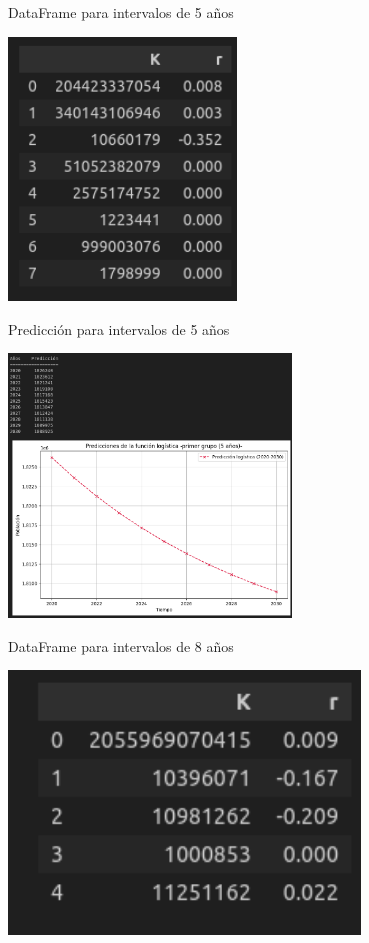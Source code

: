\documentclass{beamer}
\begin{document}
\begin{frame}{DataFrame para intervalos de 5 años}
    \begin{center}
    \includegraphics[height = 7cm]{img/df5.png}
    \end{center}
\end{frame} 


\begin{frame}{Predicción para intervalos de 5 años}
    \begin{center}
    \includegraphics[height = 7cm]{img/df5_graph.png}
    \end{center}
\end{frame}


\begin{frame}{DataFrame para intervalos de 8 años}
    \begin{center}
    \includegraphics[height = 7cm]{img/df8.png}
    \end{center}
\end{frame} 
\end{document}
